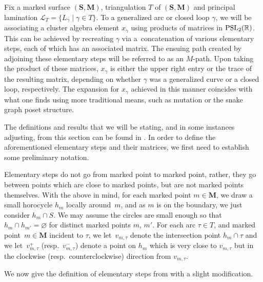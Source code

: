 \documentclass[10pt,a4paper]{amsart}
\numberwithin{equation}{section}
\theoremstyle{definition}
\newcommand{\SM}{(\mathbf{S}, \mathbf{M})}
\begin{document}
Fix a marked surface $\SM$, triangulation $T$ of $\SM$ and principal lamination $\mathcal{L}_T=\{L_{\gamma} \mid \gamma\in T\}$. To a generalized arc or closed loop $\gamma$, we will be associating a cluster algebra element $x_{\gamma}$ using products of matrices in ${\rm PSL}_2(\mathbb{R})$. This can be achieved by recreating $\gamma$ via a~concatenation of various elementary steps, each of which has an associated matrix. The ensuing path created by adjoining these elementary steps will be referred to as an $M$-path. Upon taking the product of these matrices, $x_{\gamma}$ is either the upper right entry or the trace of the resulting matrix, depending on whether $\gamma$ was a generalized curve or a closed loop, respectively. The expansion for $x_{\gamma}$ achieved in this manner coincides with what one finds using more traditional means, such as mutation or the snake graph poset structure.

The definitions and results that we will be stating, and in some instances adjusting, from this section can be found in \cite[Sections~4 and~5]{MW13}. In order to define the aforementioned elementary steps and their matrices, we first need to establish some preliminary notation.

Elementary steps do not go from marked point to marked point, rather, they go between points which are close to marked points, but are not marked points themselves. With the above in mind, for each marked point $m\in \mathbf{M}$, we draw a small horocycle $h_m$ locally around~$m$, and as $m$ is on the boundary, we just consider $h_m\cap S$. We may assume the circles are small enough so that $h_m\cap h_{m'}=\varnothing$ for distinct marked points $m$, $m'$. For each arc $\tau\in T$, and marked point~${m\in \mathbf{M}}$ incident to $\tau$, we let~$v_{m, \tau}$ denote the intersection point $h_m\cap \tau$ and we let~$v^{+}_{m, \tau}$ (resp.\ $v^{-}_{m, \tau}$) denote a point on $h_m$ which is very close to $v_{m, \tau}$ but in the clockwise (resp.\ counterclockwise) direction from $v_{m, \tau}$.

We now give the definition of elementary steps from \cite{MW13} with a slight modification.
\end{document}
